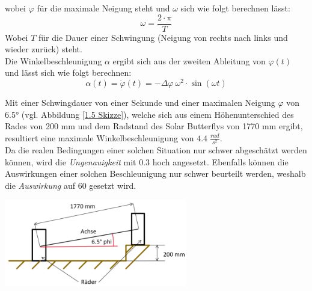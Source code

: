 \begin{description}
    wobei $\varphi$ für die maximale Neigung steht und $\omega$ sich wie folgt berechnen lässt:
    \begin{equation}
      \omega = \frac{2\cdot \pi}{T}
    \end{equation}
    Wobei $T$ für die Dauer einer Schwingung (Neigung von rechts nach links und wieder zurück) steht.\\
    Die Winkelbeschleunigung $\alpha$ ergibt sich aus der zweiten Ableitung von $\varphi(t)$ und lässt sich wie folgt berechnen:
    \begin{equation}
      \alpha(t) = \ddot \varphi(t) = -\Delta\varphi\:\omega^2 \cdot \sin \left(\omega t \right)
    \end{equation}

    Mit einer Schwingdauer von einer Sekunde und einer maximalen Neigung $\varphi$ von 6.5° (vgl. Abbildung \ref{1.5 Skizze}), welche sich aus einem Höhenunterschied des Rades von 200 mm und dem Radstand des Solar Butterflys von 1770 mm ergibt, resultiert eine maximale Winkelbeschleunigung von $4.4 \; \frac{rad}{s^2}$.\\
    Da die realen Bedingungen einer solchen Situation nur schwer abgeschätzt werden können, wird die \emph{Ungenauigkeit} mit 0.3 hoch angesetzt. Ebenfalls können die Auswirkungen einer solchen Beschleunigung nur schwer beurteilt werden, weshalb die \emph{Auswirkung} auf 60 gesetzt wird.

    \begin{center}
      \includegraphics[width=0.6\textwidth]{04_Figures/1.5 Skizze.png}
      \label{1.5 Skizze}
    \end{center}

  \end{description}

